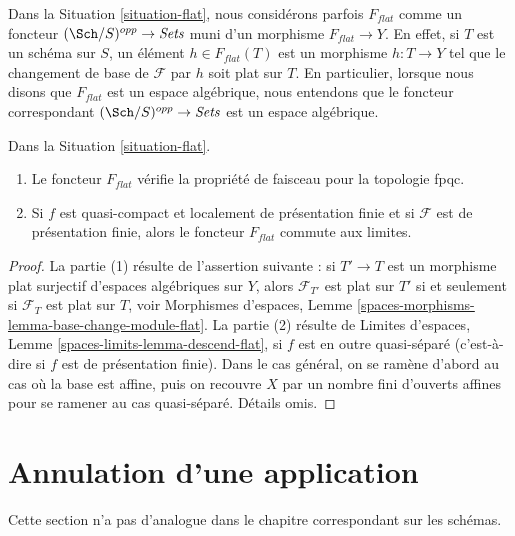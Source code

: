 \noindent
Dans la Situation \ref{situation-flat}, nous considérons parfois $F_{flat}$ comme un foncteur
$(\Sch/S)^{opp} \to \textit{Sets}$ muni d'un morphisme
$F_{flat} \to Y$. En effet, si $T$ est un schéma sur $S$,
un élément $h \in F_{flat}(T)$ est un morphisme $h : T \to Y$
tel que le changement de base de $\mathcal{F}$ par $h$ soit plat sur $T$.
En particulier, lorsque nous disons
que $F_{flat}$ est un espace algébrique, nous entendons que le foncteur
correspondant $(\Sch/S)^{opp} \to \textit{Sets}$ est un espace algébrique.

\begin{lemma}
\label{lemma-flat}
Dans la Situation \ref{situation-flat}.
\begin{enumerate}
\item Le foncteur $F_{flat}$ vérifie la propriété de faisceau pour la topologie fpqc.
\item Si $f$ est quasi-compact et localement de présentation finie
et si $\mathcal{F}$ est de présentation finie, alors le foncteur
$F_{flat}$ commute aux limites.
\end{enumerate}
\end{lemma}

\begin{proof}
La partie (1) résulte de l'assertion suivante : si $T' \to T$ est un morphisme
plat surjectif d'espaces algébriques sur $Y$, alors
$\mathcal{F}_{T'}$ est plat sur $T'$ si et seulement si
$\mathcal{F}_T$ est plat sur $T$, voir
Morphismes d'espaces, Lemme \ref{spaces-morphisms-lemma-base-change-module-flat}.
La partie (2) résulte de
Limites d'espaces, Lemme \ref{spaces-limits-lemma-descend-flat},
si $f$ est en outre quasi-séparé (c'est-à-dire si $f$ est de présentation finie).
Dans le cas général, on se ramène d'abord au cas où la
base est affine, puis on recouvre $X$ par un nombre fini d'ouverts affines
pour se ramener au cas quasi-séparé. Détails omis.
\end{proof}










\section{Annulation d'une application}
\label{section-zero-map}

\noindent
Cette section n'a pas d'analogue dans le chapitre correspondant sur les schémas.

